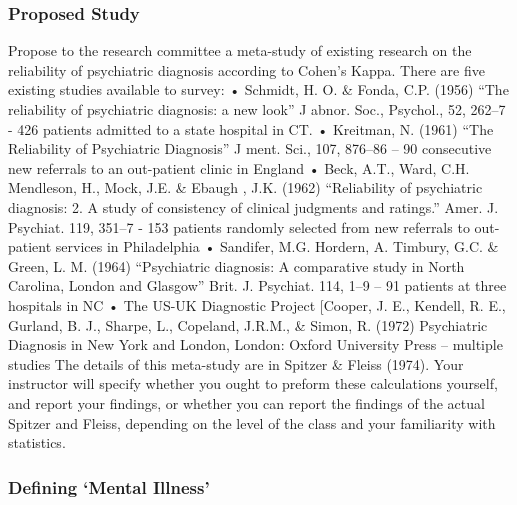 \subsubsection{Proposed Study}
\label{proposedstudy}

Propose to the research committee a meta-study of existing research on the reliability of psychiatric diagnosis according to Cohen's Kappa. There are five existing studies available to survey:
• Schmidt, H. O. \& Fonda, C.P. (1956) “The reliability of psychiatric diagnosis: a new look” J abnor. Soc., Psychol., 52, 262--7 - 426 patients admitted to a state hospital in CT.
• Kreitman, N. (1961) “The Reliability of Psychiatric Diagnosis” J ment. Sci., 107, 876--86 – 90 consecutive new referrals to an out-patient clinic in England
• Beck, A.T., Ward, C.H. Mendleson, H., Mock, J.E. \& Ebaugh , J.K. (1962) “Reliability of psychiatric diagnosis: 2. A study of consistency of clinical judgments and ratings.” Amer. J. Psychiat. 119, 351--7 - 153 patients randomly selected from new referrals to out-patient services in Philadelphia
• Sandifer, M.G. Hordern, A. Timbury, G.C. \& Green, L. M. (1964) “Psychiatric diagnosis: A comparative study in North Carolina, London and Glasgow” Brit. J. Psychiat. 114, 1--9 – 91 patients at three hospitals in NC
• The US-UK Diagnostic Project [Cooper, J. E., Kendell, R. E., Gurland, B. J., Sharpe, L., Copeland, J.R.M., \& Simon, R. (1972) Psychiatric Diagnosis in New York and London, London: Oxford University Press – multiple studies
 The details of this meta-study are in Spitzer \& Fleiss (1974). Your instructor will specify whether you ought to preform these calculations yourself, and report your findings, or whether you can report the findings of the actual Spitzer and Fleiss, depending on the level of the class and your familiarity with statistics.

\subsubsection{Defining `Mental Illness'}
\label{definingmentalillness}

